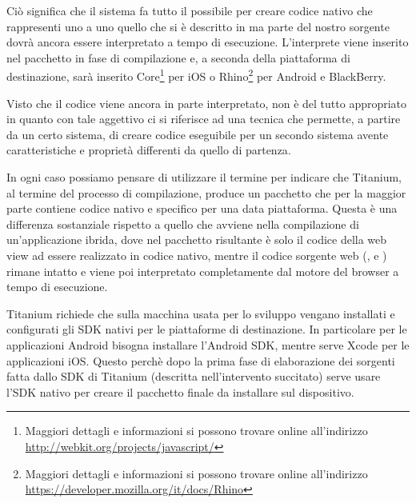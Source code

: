             Ciò significa che il sistema fa tutto il possibile per creare codice
            nativo che rappresenti uno a uno quello che si è descritto in
            \js{} ma parte del nostro sorgente dovrà ancora essere
            interpretato a tempo di esecuzione. L'interprete \js{} viene
            inserito nel pacchetto in fase di compilazione e, a seconda della
            piattaforma di destinazione, sarà inserito
            \js{}Core\footnote{Maggiori dettagli e informazioni si possono
            trovare online all'indirizzo\\ \url{http://webkit.org/projects/javascript/}}
            per iOS o Rhino\footnote{Maggiori dettagli e informazioni si possono trovare
            online all'indirizzo\\ \url{https://developer.mozilla.org/it/docs/Rhino}}
            per Android e BlackBerry\citep{Web:KevinPost}.

            Visto che il codice \js{} viene ancora in parte interpretato,
            \crosscomp{} non è del tutto appropriato in quanto con tale
            aggettivo ci si riferisce ad una tecnica che permette, a partire da
            un certo sistema, di creare codice eseguibile per un secondo sistema
            avente caratteristiche e proprietà differenti da quello di
            partenza\citep{Web:Wiki.cross-compiling}.

            In ogni caso possiamo pensare di utilizzare il termine
            \crosscomp{} per indicare che Titanium, al termine del processo di
            compilazione, produce un pacchetto che per la
            maggior parte contiene codice nativo e specifico per una data
            piattaforma. Questa è una differenza sostanziale rispetto a quello
            che avviene nella compilazione di un'applicazione ibrida, dove nel
            pacchetto risultante è solo il codice della web view ad essere
            realizzato in codice nativo, mentre il codice sorgente web
            (\js{}, \html{} e \css{}) rimane intatto e viene poi interpretato
            completamente dal motore del browser a tempo di esecuzione.

            Titanium richiede che sulla macchina usata per lo sviluppo vengano
            installati e configurati gli SDK nativi per le piattaforme di
            destinazione. In particolare per le applicazioni Android bisogna
            installare l'Android SDK, mentre serve Xcode per le applicazioni
            iOS. Questo perchè dopo la prima fase di elaborazione dei sorgenti
            fatta dallo SDK di Titanium (descritta nell'intervento succitato)
            serve usare l'SDK nativo per creare il pacchetto finale da
            installare sul dispositivo.

